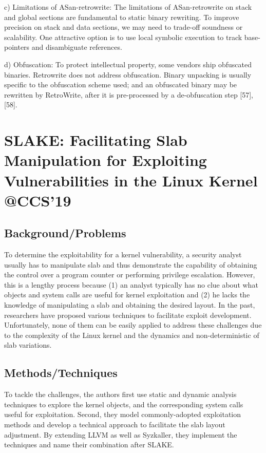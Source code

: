 c) Limitations of ASan-retrowrite: The limitations of ASan-retrowrite on stack and global sections are fundamental to static binary rewriting. To improve precision on stack and data sections, we may need to trade-off soundness or scalability. One attractive option is to use local symbolic execution to track base-pointers and disambiguate references.  

d) Obfuscation: To protect intellectual property, some vendors ship obfuscated binaries. Retrowrite does not address obfuscation. Binary unpacking is usually specific to the obfuscation scheme used; and an obfuscated binary may be rewritten by RetroWrite, after it is pre-processed by a de-obfuscation step [57], [58].
\newpage
\section{SLAKE: Facilitating Slab Manipulation for Exploiting
Vulnerabilities in the Linux Kernel \\@CCS'19}

\subsection{Background/Problems}
To determine the exploitability for a kernel vulnerability, a security analyst usually has to manipulate slab and thus demonstrate the capability of obtaining the control over a program counter or performing privilege escalation. However, this is a lengthy process because (1) an analyst typically has no clue about what objects and system calls are useful for kernel exploitation and (2) he lacks the knowledge of manipulating a slab and obtaining the desired layout. In the past, researchers have proposed various techniques to facilitate exploit development. Unfortunately, none of them can be easily applied to address these challenges due to the complexity of the Linux kernel and the dynamics and non-deterministic of slab variations.
\subsection{Methods/Techniques}
To tackle the challenges, the authors first use static and dynamic analysis techniques to explore the kernel objects, and the corresponding system calls useful for exploitation. Second, they model commonly-adopted exploitation methods and develop a technical approach to facilitate the slab layout adjustment. By extending LLVM as well as Syzkaller, they implement the techniques and name their combination after SLAKE. 

